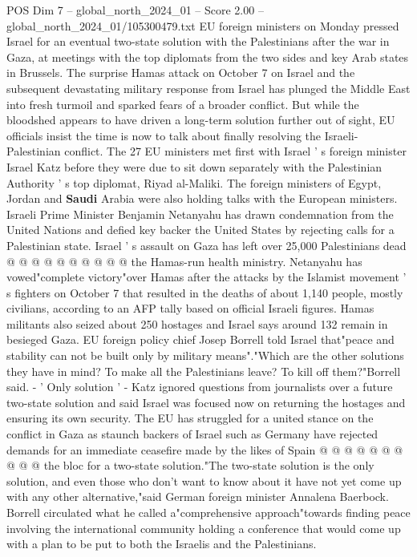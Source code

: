 \begin{textsample}{POS Dim 7 – global\_north\_2024\_01 – Score 2.00 – global\_north\_2024\_01/105300479.txt}  \label{ex:f7_pos_246}
EU foreign ministers on Monday pressed Israel for an eventual two-state solution with the Palestinians after the war in Gaza, at meetings with the top diplomats from the two sides and key Arab states in Brussels.
The surprise Hamas attack on October 7 on Israel and the subsequent devastating military response from Israel has plunged the Middle East into fresh turmoil and sparked fears of a broader conflict.
But while the bloodshed appears to have driven a long-term solution further out of sight, EU officials insist the time is now to talk about finally resolving the Israeli-Palestinian conflict.
The 27 EU ministers met first with Israel ' s foreign minister Israel Katz before they were due to sit down separately with the Palestinian Authority ' s top diplomat, Riyad al-Maliki.
The foreign ministers of Egypt, Jordan and \textbf{Saudi} Arabia were also holding talks with the European ministers.
Israeli Prime Minister Benjamin Netanyahu has drawn condemnation from the United Nations and defied key backer the United States by rejecting calls for a Palestinian state.
Israel ' s assault on Gaza has left over 25,000 Palestinians dead @ @ @ @ @ @ @ @ @ @ the Hamas-run health ministry.
Netanyahu has vowed"complete victory"over Hamas after the attacks by the Islamist movement ' s fighters on October 7 that resulted in the deaths of about 1,140 people, mostly civilians, according to an AFP tally based on official Israeli figures.
Hamas militants also seized about 250 hostages and Israel says around 132 remain in besieged Gaza.
EU foreign policy chief Josep Borrell told Israel that"peace and stability can not be built only by military means"."Which are the other solutions they have in mind?
To make all the Palestinians leave?
To kill off them?"Borrell said. - ' Only solution ' - Katz ignored questions from journalists over a future two-state solution and said Israel was focused now on returning the hostages and ensuring its own security.
The EU has struggled for a united stance on the conflict in Gaza as staunch backers of Israel such as Germany have rejected demands for an immediate ceasefire made by the likes of Spain @ @ @ @ @ @ @ @ @ @ the bloc for a two-state solution."The two-state solution is the only solution, and even those who don't want to know about it have not yet come up with any other alternative,"said German foreign minister Annalena Baerbock.
Borrell circulated what he called a"comprehensive approach"towards finding peace involving the international community holding a conference that would come up with a plan to be put to both the Israelis and the Palestinians.

\end{textsample}
